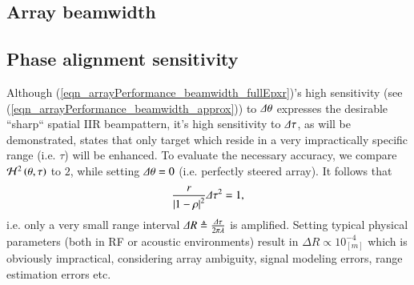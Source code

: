 \subsection{Array beamwidth}

\subsection*{Phase alignment sensitivity}
Although (\ref{eqn_arrayPerformance_beamwidth_fullEpxr})'s high sensitivity (see (\ref{eqn_arrayPerformance_beamwidth_approx})) to $\Delta\theta$ expresses the desirable ``sharp`` spatial IIR beampattern, it's high sensitivity to $\Delta\tau$, as will be demonstrated, states that only target which reside in a very impractically specific range (i.e. $\tau$) will be enhanced. To evaluate the necessary accuracy, we compare $\mathcal{H}^{2}\left(\theta,\tau\right)$ to $2$, while setting $\Delta\theta=0$ (i.e. perfectly steered array). It follows that $$\frac{r}{\left|1-\rho\right|^{2}}\Delta\tau^{2} = 1,$$ i.e. only a very small range interval $\Delta{R} \triangleq \frac{\Delta\tau}{2\pi{}\lambda}$ is amplified. Setting typical physical parameters (both in RF or acoustic environments) result in $\Delta{R} \propto 10^{-4}_{\left[m\right]}$ which is obviously impractical, considering array ambiguity, signal modeling errors, range estimation errors etc.